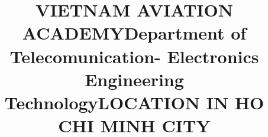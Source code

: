 \documentclass{report}
\begin{document}
\title{\LARGE VIETNAM AVIATION ACADEMY}
\title{\normalsize Department of Telecomunication- Electronics Engineering Technology}
\title{LOCATION IN HO CHI MINH CITY}
\end{document}
